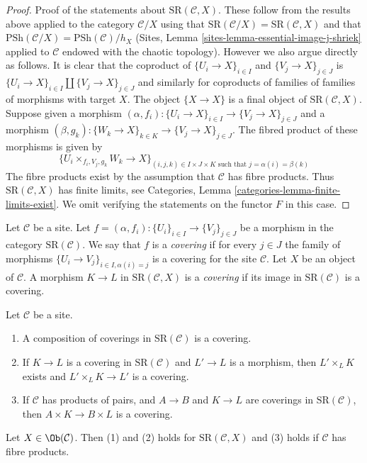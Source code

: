 \begin{proof}
\medskip\noindent
Proof of the statements about $\text{SR}(\mathcal{C}, X)$.
These follow from the results above applied to the category
$\mathcal{C}/X$ using that
$\text{SR}(\mathcal{C}/X) = \text{SR}(\mathcal{C}, X)$ and that
$\text{PSh}(\mathcal{C}/X) = \text{PSh}(\mathcal{C})/h_X$
(Sites, Lemma \ref{sites-lemma-essential-image-j-shriek} applied
to $\mathcal{C}$ endowed with the chaotic topology). However
we also argue directly as follows.
It is clear that the coproduct of
$\{U_i \to X\}_{i \in I}$ and $\{V_j \to X\}_{j \in J}$
is $\{U_i \to X\}_{i \in I} \amalg \{V_j \to X\}_{j \in J}$
and similarly for coproducts of
families of families of morphisms with target $X$.
The object $\{X \to X\}$ is a final
object of $\text{SR}(\mathcal{C}, X)$.
Suppose given a morphism
$(\alpha, f_i) : \{U_i \to X\}_{i \in I} \to \{V_j \to X\}_{j \in J}$
and a morphism
$(\beta, g_k) : \{W_k \to X\}_{k \in K} \to \{V_j \to X\}_{j \in J}$.
The fibred product of these morphisms is given by
$$
\{ U_i \times_{f_i, V_j, g_k} W_k \to X \}_{(i, j, k) \in I \times J \times K
\text{ such that } j = \alpha(i) = \beta(k)}
$$
The fibre products exist by the assumption that
$\mathcal{C}$ has fibre products.
Thus $\text{SR}(\mathcal{C}, X)$ has finite limits,
see Categories, Lemma \ref{categories-lemma-finite-limits-exist}.
We omit verifying the statements on the functor $F$ in this case.
\end{proof}

\begin{definition}
\label{definition-covering-SR}
Let $\mathcal{C}$ be a site. Let
$f = (\alpha, f_i) : \{U_i\}_{i \in I} \to \{V_j\}_{j \in J}$
be a morphism in the category $\text{SR}(\mathcal{C})$.
We say that $f$ is a {\it covering} if for every $j \in J$ the
family of morphisms $\{U_i \to V_j\}_{i \in I, \alpha(i) = j}$
is a covering for the site $\mathcal{C}$.
Let $X$ be an object of $\mathcal{C}$.
A morphism $K \to L$ in $\text{SR}(\mathcal{C}, X)$ is
a {\it covering} if its image in $\text{SR}(\mathcal{C})$ is
a covering.
\end{definition}

\begin{lemma}
\label{lemma-covering-permanence}
Let $\mathcal{C}$ be a site.
\begin{enumerate}
\item A composition of coverings in $\text{SR}(\mathcal{C})$
is a covering.
\item If $K \to L$ is a covering in $\text{SR}(\mathcal{C})$
and $L' \to L$ is a morphism, then $L' \times_L K$ exists
and $L' \times_L K \to L'$ is a covering.
\item If $\mathcal{C}$ has products of pairs, and
$A \to B$ and $K \to L$ are coverings in $\text{SR}(\mathcal{C})$,
then $A \times K \to B \times L$ is a covering.
\end{enumerate}
Let $X \in \Ob(\mathcal{C})$. Then (1) and (2) holds for
$\text{SR}(\mathcal{C}, X)$ and (3) holds if $\mathcal{C}$
has fibre products.
\end{lemma}

